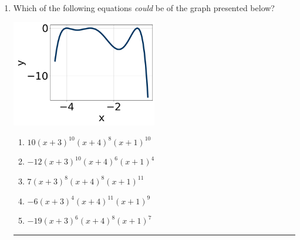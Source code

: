 \documentclass[14pt]{extbook}
\newcommand{\litem}[1]{\item#1\hspace*{-1cm}\rule{\textwidth}{0.4pt}}
\begin{document}
\begin{enumerate}
{\begin{enumerate}[label=\Alph*.]
\end{enumerate} }
\litem{
Which of the following equations \textit{could} be of the graph presented below?
\begin{center}
    \includegraphics[width=0.5\textwidth]{../Figures/polyGraphToFunctionA.png}
\end{center}
\begin{enumerate}[label=\Alph*.]
\item \( 10(x + 3)^{10} (x + 4)^{8} (x + 1)^{10} \)
\item \( -12(x + 3)^{10} (x + 4)^{6} (x + 1)^{4} \)
\item \( 7(x + 3)^{8} (x + 4)^{8} (x + 1)^{11} \)
\item \( -6(x + 3)^{4} (x + 4)^{11} (x + 1)^{9} \)
\item \( -19(x + 3)^{6} (x + 4)^{8} (x + 1)^{7} \)


\end{enumerate}}
\end{enumerate}
\end{document}
